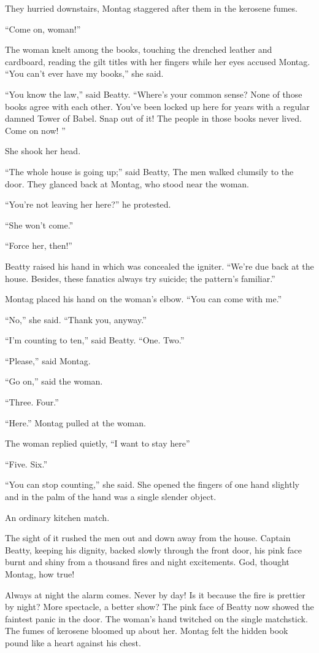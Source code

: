 \documentclass[11pt,openany]{book}
\begin{document}
They hurried downstairs, Montag staggered after them in the kerosene fumes.

``Come on, woman!''

The woman knelt among the books, touching the drenched leather and cardboard, reading the gilt titles with her fingers while her eyes accused Montag. ``You can't ever have my books,'' she said.

``You know the law,'' said Beatty. ``Where's your common sense? None of those books agree with each other. You've been locked up here for years with a regular damned Tower of Babel. Snap out of it! The people in those books never lived. Come on now! ''

She shook her head.

``The whole house is going up;'' said Beatty, The men walked clumsily to the door. They glanced back at Montag, who stood near the woman.

``You're not leaving her here?'' he protested.

``She won't come.''

``Force her, then!''

Beatty raised his hand in which was concealed the igniter. ``We're due back at the house. Besides, these fanatics always try suicide; the pattern's familiar.''

Montag placed his hand on the woman's elbow. ``You can come with me.''

``No,'' she said. ``Thank you, anyway.''

``I'm counting to ten,'' said Beatty. ``One. Two.''

``Please,'' said Montag.

``Go on,'' said the woman.

``Three. Four.''

``Here.'' Montag pulled at the woman.

The woman replied quietly, ``I want to stay here''

``Five. Six.''

``You can stop counting,'' she said. She opened the fingers of one hand slightly and in the palm of the hand was a single slender object.

An ordinary kitchen match.

The sight of it rushed the men out and down away from the house. Captain Beatty, keeping his dignity, backed slowly through the front door, his pink face burnt and shiny from a thousand fires and night excitements. God, thought Montag, how true!

Always at night the alarm comes. Never by day! Is it because the fire is prettier by night? More spectacle, a better show? The pink face of Beatty now showed the faintest panic in the door. The woman's hand twitched on the single matchstick. The fumes of kerosene bloomed up about her. Montag felt the hidden book pound like a heart against his chest.
\end{document}
